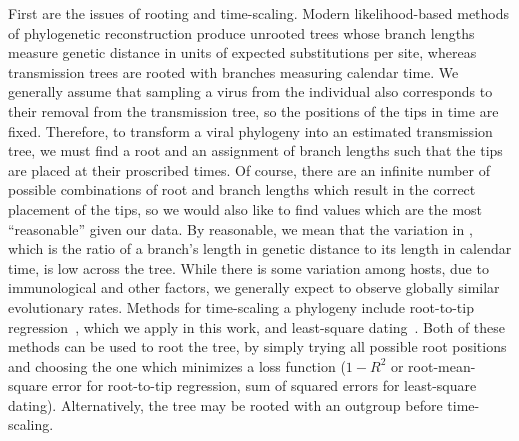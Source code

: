 First are the issues of rooting and time-scaling. Modern likelihood-based
methods of phylogenetic reconstruction produce unrooted trees whose branch
lengths measure genetic distance in units of expected substitutions per site,
whereas transmission trees are rooted with branches measuring calendar time.
We generally assume that sampling a virus from the individual also corresponds
to their removal from the transmission tree, so the
positions of the tips in time are fixed. Therefore, to transform a viral
phylogeny into an estimated transmission tree, we must find a root and an
assignment of branch lengths such that the tips are placed at their proscribed
times. Of course, there are an infinite number of possible combinations of root
and branch lengths which result in the correct placement of the tips, so we
would also like to find values which are the most ``reasonable'' given our
data. By reasonable, we mean that the variation in , 
which is the ratio of a branch's length in genetic distance to its length in
calendar time, is low across the tree. While there is some variation among
hosts, due to immunological and other factors, we generally expect to observe
globally similar evolutionary rates. Methods for time-scaling a phylogeny
include root-to-tip regression~\autocite{drummond2003inference}, which we apply
in this work, and least-square dating~\autocite{to2015fast}. Both of these
methods can be used to root the tree, by simply trying all possible root
positions and choosing the one which minimizes a loss function
($1-R^2$ or root-mean-square error for root-to-tip regression, sum of squared
errors for least-square dating). Alternatively, the tree may be rooted with an
outgroup before time-scaling.

